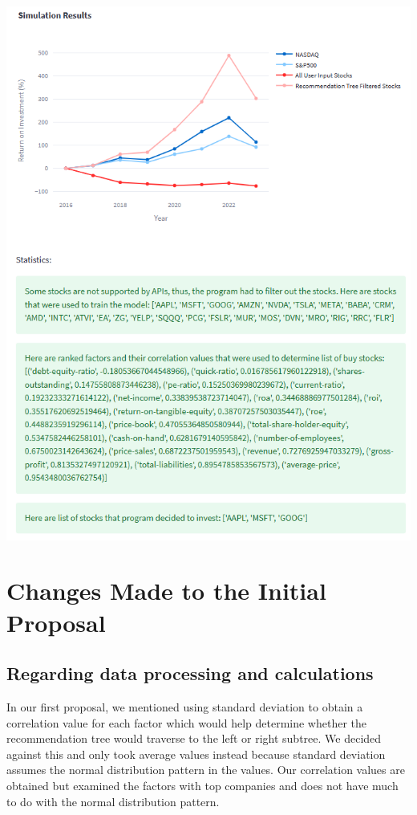 \documentclass[fontsize=11pt]{article}
\begin{document}
\begin{center}
\includegraphics[scale=1]{visualization.png}
\end{center}

\section{Changes Made to the Initial Proposal}
\subsection{Regarding data processing and calculations}
In our first proposal, we mentioned  using standard deviation to obtain a correlation value for each factor which would help determine whether the recommendation tree would traverse to the left or right subtree. We decided against this and only took average values instead because standard deviation assumes the normal distribution pattern in the values. Our correlation values are obtained but examined the factors with top companies and does not have much to do with the normal distribution pattern. 
\end{document}
